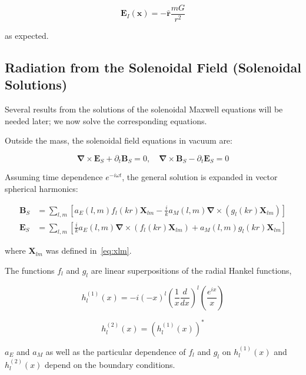 \documentclass {article}
\renewcommand\vec{\mathbf}
\let\OldS\nabla
\renewcommand{\nabla}{\boldsymbol{\OldS}}
\let\OldHat\hat
\renewcommand{\hat}[1]{\OldHat{\mathbf{#1}}}
\begin{document}
\begin{equation}
\vec E_I(\vec x) = - \hat{r}\frac {mG} {r^2}
\end{equation}

as expected.



\subsection{Radiation from the Solenoidal Field (Solenoidal Solutions)}

Several results from the solutions of the solenoidal Maxwell equations will be needed later; we now solve the corresponding equations.

Outside the mass, the solenoidal field equations in vacuum are:

\begin{equation}
\nabla \times \vec{E}_S + \partial_t \vec{B}_S = 0, \quad 
\nabla \times \vec{B}_S - \partial_t \vec{E}_S = 0
\end{equation}

Assuming time dependence \( e^{-i \omega t} \), the general solution is expanded in vector spherical harmonics:

\begin{equation}
\begin{aligned}
\vec{B}_S &= \sum_{l,m} \left[
a_E(l,m) f_l(kr) \vec{X}_{lm}
- \frac{i}{k} a_M(l,m) \nabla \times \left( g_l(kr) \vec{X}_{lm} \right)
\right] \\
\vec{E}_S &= \sum_{l,m} \left[
\frac{i}{k} a_E(l,m) \nabla \times \left( f_l(kr) \vec{X}_{lm} \right)
+ a_M(l,m) g_l(kr) \vec{X}_{lm}
\right]
\end{aligned}
\end{equation}

where \(\vec{X}_{lm}\) was defined in~\eqref{eq:xlm}.



The functions $f_l$ and $g_l$ are linear superpositions of the radial Hankel functions,

\begin{equation}
h_l^{(1)}(x) = -i (-x)^l \left(\frac 1 x \frac d {dx} \right)^l \left(\frac {e^{ix}} x \right)
\end{equation}

\begin{equation}
h_l^{(2)}(x) = \left( h_l^{(1)}(x) \right)^*
\end{equation}

\noindent $a_E$ and $a_M$ as well as the particular dependence of $f_l$ and $g_l$ on $h_l^{(1)}(x) $ and $h_l^{(2)}(x) $ depend on the boundary conditions.
\end{document}
